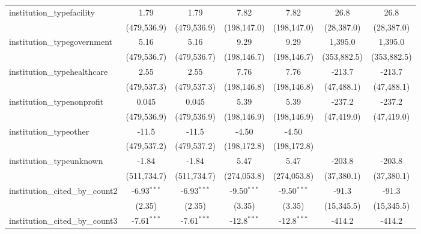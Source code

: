 \begin{tabular}{lcccccc}
   institution\_typefacility             & 1.79          & 1.79          & 7.82          & 7.82          & 26.8        & 26.8\\   
                                         & (479,536.9)   & (479,536.9)   & (198,147.0)   & (198,147.0)   & (28,387.0)  & (28,387.0)\\   
   institution\_typegovernment           & 5.16          & 5.16          & 9.29          & 9.29          & 1,395.0     & 1,395.0\\   
                                         & (479,536.7)   & (479,536.7)   & (198,146.7)   & (198,146.7)   & (353,882.5) & (353,882.5)\\   
   institution\_typehealthcare           & 2.55          & 2.55          & 7.76          & 7.76          & -213.7      & -213.7\\   
                                         & (479,537.3)   & (479,537.3)   & (198,146.8)   & (198,146.8)   & (47,488.1)  & (47,488.1)\\   
   institution\_typenonprofit            & 0.045         & 0.045         & 5.39          & 5.39          & -237.2      & -237.2\\   
                                         & (479,536.9)   & (479,536.9)   & (198,146.9)   & (198,146.9)   & (47,419.0)  & (47,419.0)\\   
   institution\_typeother                & -11.5         & -11.5         & -4.50         & -4.50         &             &   \\   
                                         & (479,537.2)   & (479,537.2)   & (198,172.8)   & (198,172.8)   &             &   \\   
   institution\_typeunknown              & -1.84         & -1.84         & 5.47          & 5.47          & -203.8      & -203.8\\   
                                         & (511,734.7)   & (511,734.7)   & (274,053.8)   & (274,053.8)   & (37,380.1)  & (37,380.1)\\   
   institution\_cited\_by\_count2        & -6.93$^{***}$ & -6.93$^{***}$ & -9.50$^{***}$ & -9.50$^{***}$ & -91.3       & -91.3\\   
                                         & (2.35)        & (2.35)        & (3.35)        & (3.35)        & (15,345.5)  & (15,345.5)\\   
   institution\_cited\_by\_count3        & -7.61$^{***}$ & -7.61$^{***}$ & -12.8$^{***}$ & -12.8$^{***}$ & -414.2      & -414.2\\   

\end{tabular}
